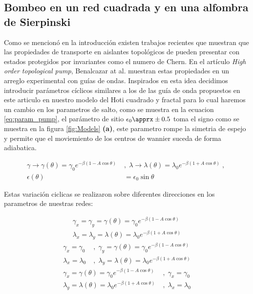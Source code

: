 

\subsection{Bombeo en un red cuadrada y en una alfombra de Sierpinski}

Como se mencionó en la introducción existen trabajos recientes que muestran que las propiedades de transporte en aislantes topológicos de pueden presentar con estados protegidos por invariantes como el numero de Chern. En el artículo \textit{High order topological pump}\cite{benalcazar2020higher}, Benalcazar at al. muestran estas propiedades en un arreglo experimental con guías de ondas. Inspirados en esta idea decidimos introducir parámetros cíclicos similares a los de las guía de onda propuestos en este articulo en nuestro modelo del Hoti cuadrado y fractal para lo cual haremos un cambio en los parametros de salto, como se muestra en la ecuacion \ref{eq:param_pump}, el parámetro de sitio $\epsilon_0 \apprx \pm 0.5$ toma el signo como se muestra en la figura \ref{fig:Models} \textbf{(a)}, este parametro rompe la simetria de espejo y permite que el moviemiento de los centros de wannier suceda de forma adiabatica.

\begin{align}
    \label{eq:param_pump}
    \nonumber\gamma \rightarrow \gamma (\theta) = \gamma_0 e^{\displaystyle-\beta(1 - A \cos \theta )} \; &,\;  \lambda \rightarrow \lambda(\theta) = \lambda_0 e^{\displaystyle-\beta( 1 + A \cos \theta )} \;,\; \\  \epsilon(\theta) &= \epsilon_0 \sin \theta
\end{align}

Estas variación ciclicas se realizaron sobre diferentes direcciones en los parametros de nuestras redes: 

\begin{align}
    \label{eq:param_pumpxy}
    \nonumber \gamma_x = \gamma_y = \gamma (\theta) = \gamma_0 e^{\displaystyle-\beta(1 - A \cos \theta )} \\ \lambda_x = \lambda_y = \lambda(\theta) = \lambda_0 e^{\displaystyle-\beta( 1 + A \cos \theta )}
\end{align}
\begin{align}
    \label{eq:param_pumpx}
    \nonumber \gamma_x =\gamma_0 \; &,\; \gamma_y = \gamma (\theta) = \gamma_0 e^{\displaystyle-\beta(1 - A \cos \theta )} \\
    \lambda_x = \lambda_0  \; &,\;  \lambda_y = \lambda(\theta) = \lambda_0 e^{\displaystyle-\beta( 1 + A \cos \theta )}
\end{align}
\begin{align}
    \label{eq:param_pumpy}
    \nonumber \gamma_x = \gamma (\theta) = \gamma_0 e^{\displaystyle-\beta(1 - A \cos \theta )}   \; &,\; \gamma_x =\gamma_0 \\
    \lambda_y = \lambda(\theta) = \lambda_0 e^{\displaystyle-\beta( 1 + A \cos \theta )} \; &,\; \lambda_x = \lambda_0  
\end{align}

